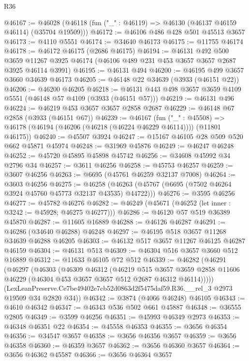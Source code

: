 \begin{lexlean}{R36}
\begin{coremodule}
@46167 := @46028 (@46118 (fun ("_" : @46119) => @46130 (@46137 @46159 @46114) (@35704 @19509)))
@46172 := @46106 @486 @428 @501 @45513 @3657
@46173 := @4110 @5551
@46174 := @34640 @46173
@46175 := @11755 @46174
@46178 := @46172 @46175 (@2686 @46175)
@46194 := @46131
    @492
    @500
    @3659
    @11267
    @3925
    @46174
    (@46106 @489 @231 @453 @3657 @3657 @2687 @3925 @46114 @3991)
@46195 := @46131 @494
@46200 := @46195 @499 @3657 @3660 @34639 @46173
@46205 := @46148 @22 @34639 (@3933 (@46151 @22))
@46206 := @46200 @46205
@46218 := @46131 @443 @498 @3657 @3659 @4109 @5551 (@46148 @57 @4109 (@3933 (@46151 @57)))
@46219 := @46131 @496
@46224 := @46219 @453 @3657 @3657 @2858 @2687
@46229 := @46148 @67 @2858 (@3933 (@46151 @67))
@46239 := @46167
    (fun ("_" : @45508) => @46178 (@46194 (@46206 (@46218 (@46224 @46229 @46114)))) (@11801 @46175))
@46240 := @45507 @3924
@46247 := @15167 @46105 @28 @509 @520 @662 @45871 @45974
@46248 := @31969 @45876
@46249 := @46247 @46248
@46252 := @45720 @45895 @45898 @45742
@46256 := @34608 @45992 @34 @2796 @34
@46257 := @3611 @46256
@46258 := @45753 @46257
@46259 := @3607 @46256
@46263 := @6695 (@45761 @46259 @32137 @7008)
@46264 := @3603 @46256
@46275 := @46258 (@46263 (@45767 (@6695 (@7502 @46264 @3924 @45760 @45773 @32137 @43535) @44722)))
@46276 := @3595 @46256
@46277 := @45782 @46276
@46282 := @46249 (@45671 (@46252 (let inner : @3242 := @45928; @46275 @46277)))
@46286 := @46120 @57 @519 @36389 @45870
@46287 := @11605 @16889
@46288 := @46126 @46287
@46291 := @46286 (@34640 @46288) @46248
@46297 := @46195 @518 @3657 @11268 @34639 @46288 @46205
@46303 := @46132 @517 @3657 @11267 @46125 @46287 @46159
@46304 := @46131 @513
@46309 := @46304 @516 @3657 @3660 @512 @16889
@46312 := @11633 @46105 @72 @512
@46339 := @46282
    (@46291
      (@46297
        (@46303
          (@46309
            @46312
            (@46219
              @515
              @3657
              @3659
              @2858
              @11606
              @46229
              (@46304 @453 @3657 @3657 @512 @2687 @46312 @46114)))))
      (LexLeanPreserve.Ce7be49402e7cb52d0863d2f5475daf59.R36.__rel_3 @2973 @19509 @34 @2820 @34))
@46342 := @3874 (@4066 @46248) @46105
@46343 := @4610 @46342
@46347 := @46343 @536 @502 @661 @45887
@46348 := @36555 @2805
@46349 := @3599 @46256
@46351 := @45993 @46349 @2973
@46353 := @46348 @46351 @22
@46354 := @45558 @46353
@46355 := @3656 @46354
@46356 := @34547 @3657
@46358 := @3656 @46356 @3657
@46359 := @3656 @46358
@46360 := @46359 @3657
@46362 := @3656 @46360 @3657
@46364 := @3656 @46362 @45587
@46366 := @3656 @46364 @3657

\end{coremodule}
\end{lexlean}
